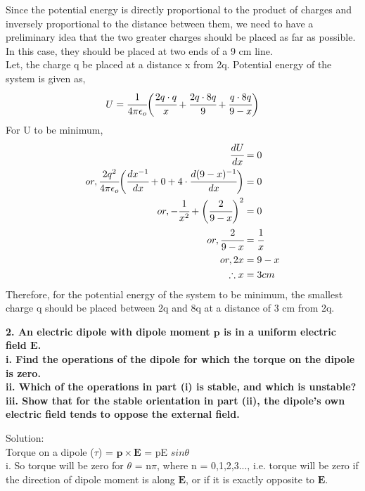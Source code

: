  Since the potential energy is directly proportional to the product of charges and inversely proportional to the distance between them, we need to have a preliminary idea that the two greater charges should be placed as far as possible. In this case, they should be placed at two ends of a 9 cm line.\\
 Let, the charge q be placed at a distance x from 2q.
 Potential energy of the system is given as,
 \begin{equation}
     U = \cfrac{1}{4 \pi \epsilon_o} \bigg(\cfrac{2q \cdot q}{x} + \cfrac{2q \cdot 8q}{9} + \cfrac{q \cdot 8q}{9 - x} \bigg)
 \end{equation}
 For U to be minimum,
 \begin{align*}
 \cfrac{dU}{dx} &= 0\\
 or, \cfrac{2q^2}{4 \pi \epsilon_o}\bigg(\cfrac{dx^{-1}}{dx} + 0 + 4 \cdot \cfrac{d(9 - x)^{-1}}{dx}\bigg) &= 0\\
 or, - \cfrac{1}{x^2} + \bigg(\cfrac{2}{9 -x}\bigg)^2 &= 0 \\
 or, \cfrac{2}{9 -x} &= \cfrac{1}{x}\\
 or, 2x &= 9 - x \\
 \therefore x &= 3 cm
 \end{align*}
 Therefore, for the potential energy of the system to be minimum, the smallest charge q should be placed between 2q and 8q at a distance of 3 cm from 2q.
 \begin{tcolorbox}
\textbf{2. An electric dipole with dipole moment $\bm{p}$ is in a uniform electric field $\bm{E}$.\\
i. Find the operations of the dipole for which the torque on the dipole is zero.\\
ii. Which of the operations in part (i) is stable, and which is unstable?\\
iii. Show that for the stable orientation in part (ii), the dipole's own electric field tends to oppose the external field.}
\end{tcolorbox}
Solution:\\
Torque on a dipole ($\tau$) = $\bm{p} \times \bm{E}$ = pE $sin \theta$\\
i. So torque will be zero for $\theta$ = n$\pi$, where n = 0,1,2,3..., i.e. torque will be zero if the direction of dipole moment is along $\bm{E}$, or if it is exactly opposite to $\bm{E}$.
